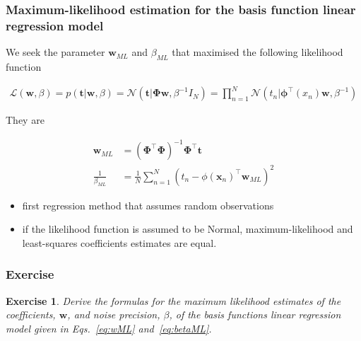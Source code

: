 \documentclass[11pt]{beamer}
\newtheorem{probExercise}{Exercise}
\begin{document}
\begin{frame}
    \frametitle{Maximum-likelihood estimation for the basis function linear
    regression model}

    \footnotesize
    We seek the parameter $\mathbf{w}_{ML}$ and $\beta_{ML}$ that maximised the following likelihood function

    \begin{align}
        \mathcal{L}(\mathbf{w},\beta)=p(\mathbf{t}|\mathbf{w},\beta)=\mathcal{N}(\mathbf{t}|\boldsymbol{\Phi}\mathbf{w},\beta^{-1}I_N)=\prod_{n=1}^N\mathcal{N}(t_n|\boldsymbol{\phi}^\intercal(x_n)\mathbf{w},\beta^{-1})\label{eq:likelihoodLinearRegression}
    \end{align}

    They are

    \begin{align}
        \mathbf{w}_{ML}&=(\boldsymbol{\Phi}^\intercal\boldsymbol{\Phi})^{-1}\boldsymbol{\Phi}^\intercal\mathbf{t}\label{eq:wML}\\
        \frac{1}{\beta_{ML}}&=\frac{1}{N}\sum_{n=1}^N(t_n-\phi(\mathbf{x}_n)^\intercal\mathbf{w}_{ML})^2\label{eq:betaML}
    \end{align}

	\begin{itemize}

		\item first regression method that assumes random observations

		\item if the likelihood function is assumed to be Normal,
		maximum-likelihood and least-squares coefficients estimates are equal.

	\end{itemize}

    \normalsize

\end{frame}

\begin{frame}
    \frametitle{Exercise}

    \begin{probExercise}
        Derive the formulas for the maximum likelihood estimates of the
        coefficients, $\mathbf{w}$, and noise precision, $\beta$, of the basis
        functions linear regression model given in Eqs.~\ref{eq:wML}
        and~\ref{eq:betaML}.
    \end{probExercise}

\end{frame}
\end{document}

